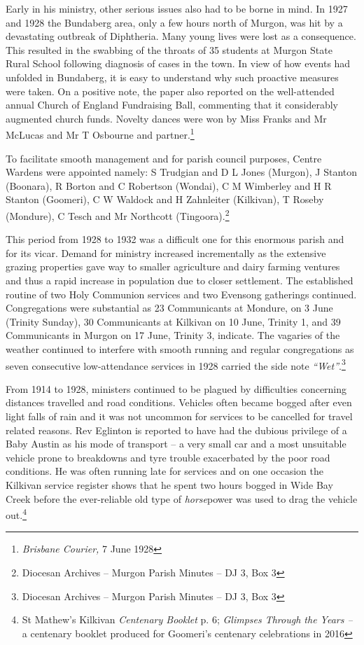 Early in his ministry, other serious issues also had to be borne in mind. In 1927 and 1928 the Bundaberg area, only a few hours north of Murgon, was hit by a devastating outbreak of Diphtheria. Many young lives were lost as a consequence. This resulted in the swabbing of the throats of 35 students at Murgon State Rural School following diagnosis of cases in the town. In view of how events had unfolded in Bundaberg, it is easy to understand why such proactive measures were taken. On a positive note, the paper also reported on the well-attended annual Church of England Fundraising Ball, commenting that it considerably augmented church funds. Novelty dances were won by Miss Franks and Mr McLucas and Mr T Osbourne and partner.\footnote{\emph{Brisbane Courier,} 7 June 1928}


To facilitate smooth management and for parish council purposes, Centre Wardens were appointed namely: S Trudgian and D L Jones (Murgon), J Stanton (Boonara), R Borton and C Robertson (Wondai), C M Wimberley and H R Stanton (Goomeri), C W Waldock and H Zahnleiter (Kilkivan), T Roseby (Mondure), C Tesch and Mr Northcott (Tingoora).\footnote{Diocesan Archives -- Murgon Parish Minutes -- DJ 3, Box 3}


This period from 1928 to 1932 was a difficult one for this enormous parish and for its vicar. Demand for ministry increased incrementally as the extensive grazing properties gave way to smaller agriculture and dairy farming ventures and thus a rapid increase in population due to closer settlement. The established routine of two Holy Communion services and two Evensong gatherings continued. Congregations were substantial as 23 Communicants at Mondure, on 3 June (Trinity Sunday), 30 Communicants at Kilkivan on 10 June, Trinity 1, and 39 Communicants in Murgon on 17 June, Trinity 3, indicate. The vagaries of the weather continued to interfere with smooth running and regular congregations as seven consecutive low-attendance services in 1928 carried the side note \emph{``Wet''}.\footnote{Diocesan Archives -- Murgon Parish Minutes -- DJ 3, Box 3}


From 1914 to 1928, ministers continued to be plagued by difficulties concerning distances travelled and road conditions. Vehicles often became bogged after even light falls of rain and it was not uncommon for services to be cancelled for travel related reasons. Rev Eglinton is reported to have had the dubious privilege of a Baby Austin as his mode of transport -- a very small car and a most unsuitable vehicle prone to breakdowns and tyre trouble exacerbated by the poor road conditions. He was often running late for services and on one occasion the Kilkivan service register shows that he spent two hours bogged in Wide Bay Creek before the ever-reliable old type of \emph{horse}power was used to drag the vehicle out.\footnote{St Mathew's Kilkivan \emph{Centenary Booklet} p. 6; \emph{Glimpses Through the Years --} a centenary booklet produced for Goomeri's centenary celebrations in 2016}








